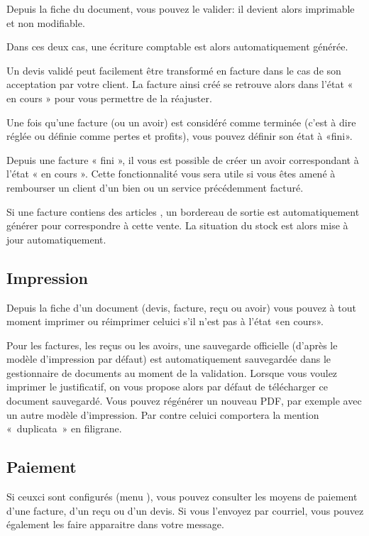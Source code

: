 \documentclass[a4paper,10pt,oneside,french]{sphinxmanual}
\begin{document}
\sphinxAtStartPar
Depuis la fiche du document, vous pouvez le valider: il devient alors imprimable et non modifiable.

\sphinxAtStartPar
Dans ces deux cas, une écriture comptable est alors automatiquement générée.

\sphinxAtStartPar
Un devis validé peut facilement être transformé en facture dans le cas de son acceptation par votre client. La facture ainsi créé se retrouve alors dans l’état « en cours » pour vous permettre de la réajuster.

\sphinxAtStartPar
Une fois qu’une facture (ou un avoir) est considéré comme terminée (c’est à dire réglée ou définie comme pertes et profits), vous pouvez définir son état à «fini».

\sphinxAtStartPar
Depuis une facture « fini », il vous est possible de créer un avoir correspondant à l’état « en cours ». Cette fonctionnalité vous sera utile si vous êtes amené à rembourser un client d’un bien ou un service précédemment facturé.

\sphinxAtStartPar
Si une facture contiens des articles , un bordereau de sortie est automatiquement générer pour correspondre à cette vente.
La situation du stock est alors mise à jour automatiquement.


\subsection{Impression}
\label{\detokenize{invoice/create_bill:impression}}
\sphinxAtStartPar
Depuis la fiche d’un document (devis, facture, reçu ou avoir) vous pouvez à tout moment imprimer ou réimprimer celui\sphinxhyphen{}ci s’il n’est pas à l’état «en cours».

\sphinxAtStartPar
Pour les factures, les reçus ou les avoirs, une sauvegarde officielle (d’après le modèle d’impression par défaut) est automatiquement sauvegardée dans le gestionnaire de documents au moment de la validation.
Lorsque vous voulez imprimer le justificatif, on vous propose alors par défaut de télécharger ce document sauvegardé.
Vous pouvez régénérer un nouveau PDF, par exemple avec un autre modèle d’impression. Par contre celui\sphinxhyphen{}ci comportera la mention « duplicata » en filigrane.


\subsection{Paiement}
\label{\detokenize{invoice/create_bill:paiement}}
\sphinxAtStartPar
Si ceux\sphinxhyphen{}ci sont configurés (menu ), vous pouvez consulter les moyens de paiement d’une facture, d’un reçu ou d’un devis.
Si vous l’envoyez par courriel, vous pouvez également les faire apparaitre dans votre message.
\end{document}
